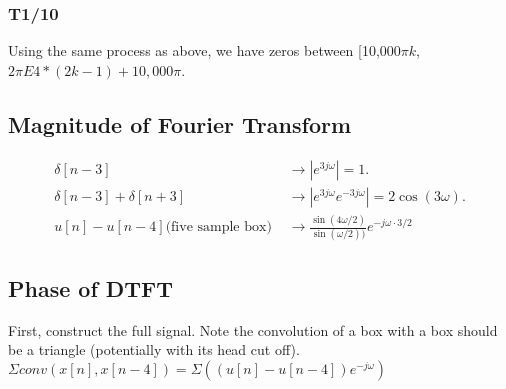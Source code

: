 \subsubsection{T1/10}
Using the same process as above, we have zeros between [10,000$\pi k$, $2\pi E4*(2k - 1) + 10,000\pi$.
\subsection{Magnitude of Fourier Transform}
\begin{align*}
 \delta[n-3]  &\to |e^{3j\omega}| = 1.\\
\delta[n-3]  + \delta[n+3] &\to |e^{3j\omega} e^{-3j\omega}| = 2\cos(3\omega).\\
u[n] - u[n-4] \text{(five sample box) } &\to \frac{\sin(4\omega/2)}{ \sin(\omega/2))}e^{-j\omega \cdot 3/2} 
\end{align*}
\subsection{Phase of DTFT}
First, construct the full signal. Note the convolution of a box with a box should be a triangle (potentially with its head cut off). $\Sigma  conv(x[n], x[n-4]) = \Sigma ((u[n] - u[n-4])e^{-j\omega})$

